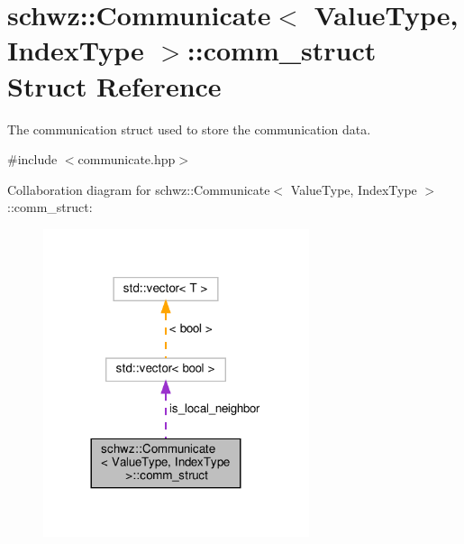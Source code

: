 \hypertarget{structschwz_1_1Communicate_1_1comm__struct}{}\section{schwz\+:\+:Communicate$<$ Value\+Type, Index\+Type $>$\+:\+:comm\+\_\+struct Struct Reference}
\label{structschwz_1_1Communicate_1_1comm__struct}


The communication struct used to store the communication data.  




{\ttfamily \#include $<$communicate.\+hpp$>$}



Collaboration diagram for schwz\+:\+:Communicate$<$ Value\+Type, Index\+Type $>$\+:\+:comm\+\_\+struct\+:
\nopagebreak
\begin{figure}[H]
\begin{center}
\leavevmode
\includegraphics[width=221pt]{structschwz_1_1Communicate_1_1comm__struct__coll__graph}
\end{center}
\end{figure}
